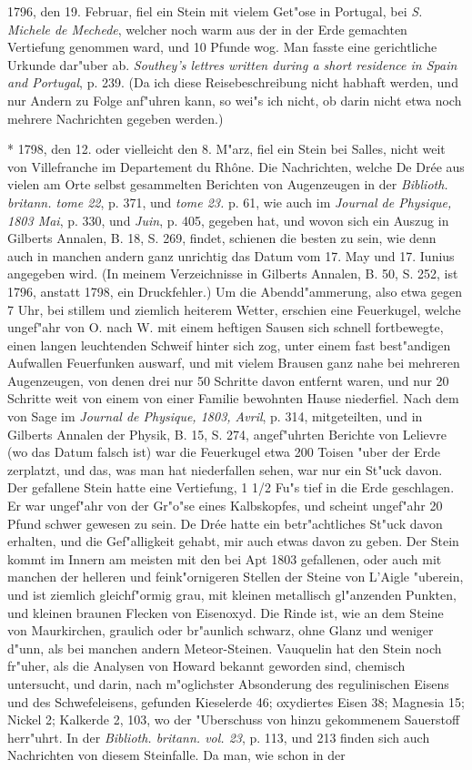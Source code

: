 \documentclass[a4paper, 11pt, oneside, polutonikogreek, german]{article}
\begin{document}
1796, den 19. Februar, fiel ein Stein mit vielem Get"ose in Portugal, bei \emph{S. Michele de Mechede}, welcher noch warm aus der in der Erde gemachten Vertiefung genommen ward, und 10 Pfunde wog. Man fasste eine gerichtliche Urkunde dar"uber ab. \emph{Southey's lettres written during a short residence in Spain and Portugal}, p. 239. (Da ich diese Reisebeschreibung nicht habhaft werden, und nur Andern zu Folge anf"uhren kann, so wei"s ich nicht, ob darin nicht etwa noch mehrere Nachrichten gegeben werden.)

* 1798, den 12. oder vielleicht den 8. M"arz, fiel ein Stein bei Salles, nicht weit von Villefranche im Departement du Rhône. Die Nachrichten, welche De Drée aus vielen am Orte selbst gesammelten Berichten von Augenzeugen in der \emph{Biblioth. britann. tome 22}, p. 371, und \emph{tome 23.} p. 61, wie auch im \emph{Journal de Physique, 1803 Mai}, p. 330, und \emph{Juin}, p. 405, gegeben hat, und wovon sich ein Auszug in Gilberts Annalen, B. 18, S. 269, findet, schienen die besten zu sein, wie denn auch in manchen andern ganz unrichtig das Datum vom 17. May und 17. Iunius angegeben wird. (In meinem Verzeichnisse in Gilberts Annalen, B. 50, S. 252, ist 1796, anstatt 1798, ein Druckfehler.) Um die Abendd"ammerung, also etwa gegen 7 Uhr, bei stillem und ziemlich heiterem Wetter, erschien eine Feuerkugel, welche ungef"ahr von O. nach W. mit einem heftigen Sausen sich schnell fortbewegte, einen langen leuchtenden Schweif hinter sich zog, unter einem fast best"andigen Aufwallen Feuerfunken auswarf, und mit vielem Brausen ganz nahe bei mehreren Augenzeugen, von denen drei nur 50 Schritte davon entfernt waren, und nur 20 Schritte weit von einem von einer Familie bewohnten Hause niederfiel. Nach dem von Sage im \emph{Journal de Physique, 1803, Avril}, p. 314, mitgeteilten, und in Gilberts Annalen der Physik, B. 15, S. 274, angef"uhrten Berichte von Lelievre (wo das Datum falsch ist) war die Feuerkugel etwa 200 Toisen "uber der Erde zerplatzt, und das, was man hat niederfallen sehen, war nur ein St"uck davon. Der gefallene Stein hatte eine Vertiefung, 1 1/2 Fu"s tief in die Erde geschlagen. Er war ungef"ahr von der Gr"o"se eines Kalbskopfes, und scheint ungef"ahr 20 Pfund schwer gewesen zu sein. De Drée hatte ein betr"achtliches St"uck davon erhalten, und die Gef"alligkeit gehabt, mir auch etwas davon zu geben. Der Stein kommt im Innern am meisten mit den bei Apt 1803 gefallenen, oder auch mit manchen der helleren und feink"ornigeren Stellen der Steine von L'Aigle "uberein, und ist ziemlich gleichf"ormig grau, mit kleinen metallisch gl"anzenden Punkten, und kleinen braunen Flecken von Eisenoxyd. Die Rinde ist, wie an dem Steine von Maurkirchen, graulich oder br"aunlich schwarz, ohne Glanz und weniger d"unn, als bei manchen andern Meteor-Steinen. Vauquelin hat den Stein noch fr"uher, als die Analysen von Howard bekannt geworden sind, chemisch untersucht, und darin, nach m"oglichster Absonderung des regulinischen Eisens und des Schwefeleisens, gefunden Kieselerde 46; oxydiertes Eisen 38; Magnesia 15; Nickel 2; Kalkerde 2, 103, wo der "Uberschuss von hinzu gekommenem Sauerstoff herr"uhrt. In der \emph{Biblioth. britann. vol. 23}, p. 113, und 213 finden sich auch Nachrichten von diesem Steinfalle. Da man, wie schon in der 
\end{document}
